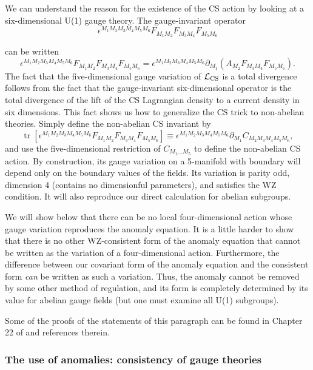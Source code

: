 We can understand the reason for the existence of the CS action by looking at
a six-dimensional U(1) gauge theory. The gauge-invariant operator
\[
  \epsilon^{M_1M_2M_3M_4M_5M_6}
  F_{M_1M_2}F_{M_3M_4}F_{M_5M_6}
\]

can be written
\[
  \epsilon^{M_1M_2M_3M_4M_5M_6}
  F_{M_1M_2}F_{M_3M_4}F_{M_5M_6}
  =\epsilon^{M_1M_2M_3M_4M_5M_6}
  \partial_{M_1}(A_{M_2}F_{M_3M_4}F_{M_5M_6}) .
\]
The fact that the five-dimensional gauge variation of $\mathcal L_{\rm CS}$
is a total divergence follows from the fact that the gauge-invariant
six-dimensional operator is the total divergence of the lift of the CS
Lagrangian density to a current density in six dimensions. This fact shows us
how to generalize the CS trick to non-abelian theories. Simply define the
non-abelian CS invariant by
\[
  \operatorname{tr}\left[\epsilon^{M_1M_2M_3M_4M_5M_6}
  F_{M_1M_2}F_{M_3M_4}F_{M_5M_6}\right]
  \equiv\epsilon^{M_1M_2M_3M_4M_5M_6}
  \partial_{M_1}C_{M_2M_3M_4M_5M_6},
\]
and use the five-dimensional restriction of $C_{M_1\ldots M_5}$ to define
the non-abelian CS action. By construction, its gauge variation on a
5-manifold with boundary will depend only on the boundary values of the
fields. Its variation is parity odd, dimension 4 (contains no dimensionful
parameters), and satisfies the WZ condition. It will also reproduce our direct
calculation for abelian subgroups.


We will show below that there can be no local four-dimensional action whose
gauge variation reproduces the anomaly equation. It is a little harder to show
that there is no other WZ-consistent form of the anomaly equation that cannot
be written as the variation of a four-dimensional action. Furthermore, the
difference between our covariant form of the anomaly equation and the
consistent form \emph{can} be written as such a variation. Thus, the anomaly
cannot be removed by some other method of regulation, and its form is
completely determined by its value for abelian gauge fields (but one must
examine all U(1) subgroups).\par\noindent
Some of the proofs of the statements of this
paragraph can be found in Chapter 22 of \cite{banks-ref-42} and references therein.

\subsubsection{The use of anomalies: consistency of gauge theories}

